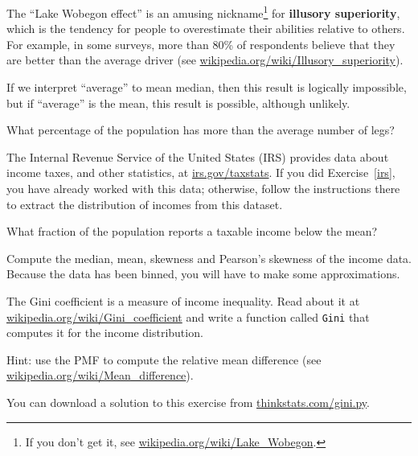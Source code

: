 \documentclass[12pt]{book}
\begin{document}
\begin{exercise}
The ``Lake Wobegon effect'' is an amusing nickname\footnote{If you
  don't get it, see \url{wikipedia.org/wiki/Lake_Wobegon}.} for {\bf
  illusory superiority}, which is the tendency for people to
overestimate their abilities relative to others.  For example, in some
surveys, more than 80\% of respondents believe that they are better
than the average driver (see
  \url{wikipedia.org/wiki/Illusory_superiority}).


If we interpret ``average'' to mean median, then this result is
logically impossible, but if ``average'' is the mean, this result is
possible, although unlikely.

What percentage of the population has more than the average number
of legs?

\end{exercise}


\begin{exercise}
The Internal Revenue Service of the United States (IRS) provides data
about income taxes, and other statistics, at \url{irs.gov/taxstats}.
If you did Exercise~\ref{irs}, you have already worked with this data;
otherwise, follow the instructions there to extract the distribution
of incomes from this dataset.


What fraction of the population reports a taxable income below the
mean?

Compute the median, mean, skewness and Pearson's skewness of the income
data.  Because the data has been binned, you will have to make
some approximations.


The Gini coefficient is a measure of income inequality.
Read about it at \url{wikipedia.org/wiki/Gini_coefficient} and write a
function called {\tt Gini} that computes it for the income
distribution.


Hint: use the PMF to compute the relative mean difference
(see \url{wikipedia.org/wiki/Mean_difference}).


You can download a solution to this exercise from \url{thinkstats.com/gini.py}.

\end{exercise}
\end{document}
